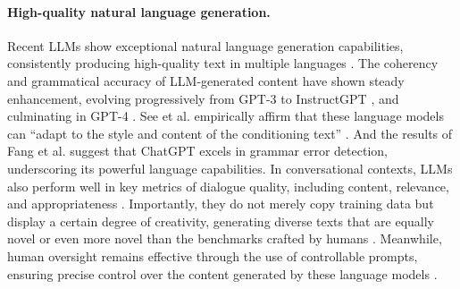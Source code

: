 \paragraph{High-quality natural language generation.}
Recent LLMs show exceptional natural language generation capabilities, consistently producing high-quality text in multiple languages \cite{DBLP:journals/corr/abs-2302-04023, DBLP:journals/corr/abs-2303-12528}. The coherency \cite{DBLP:conf/conll/SeePSYM19} and grammatical accuracy \cite{DBLP:journals/corr/abs-2304-01746} of LLM-generated content have shown steady enhancement, evolving progressively from GPT-3 \cite{DBLP:conf/nips/BrownMRSKDNSSAA20} to InstructGPT \cite{DBLP:conf/nips/Ouyang0JAWMZASR22}, and culminating in GPT-4 \cite{DBLP:journals/corr/abs-2303-08774}. See et al. \cite{DBLP:conf/conll/SeePSYM19} empirically affirm that these language models can ``adapt to the style and content of the conditioning text'' \cite{radford2019better}. And the results of Fang et al. \cite{DBLP:journals/corr/abs-2304-01746} suggest that ChatGPT excels in grammar error detection, underscoring its powerful language capabilities. In conversational contexts, LLMs also perform well in key metrics of dialogue quality, including content, relevance, and appropriateness \cite{DBLP:journals/corr/abs-2305-13711}. Importantly, they do not merely copy training data but display a certain degree of creativity, generating diverse texts that are equally novel or even more novel than the benchmarks crafted by humans \cite{DBLP:journals/corr/abs-2111-09509}. Meanwhile, human oversight remains effective through the use of controllable prompts, ensuring precise control over the content generated by these language models \cite{DBLP:conf/eacl/LuZZWY23}.



